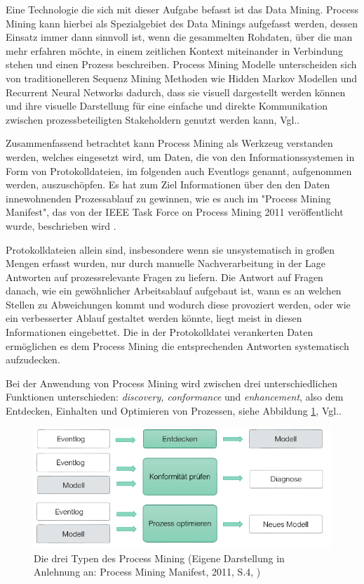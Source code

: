 Eine Technologie die sich mit dieser Aufgabe befasst ist das Data Mining. Process Mining kann hierbei als Spezialgebiet des Data Minings aufgefasst werden, dessen Einsatz immer dann sinnvoll ist, wenn die gesammelten Rohdaten, über die man mehr erfahren möchte, in einem zeitlichen Kontext miteinander in Verbindung stehen und einen Prozess beschreiben.
Process Mining Modelle unterscheiden sich von traditionelleren Sequenz Mining Methoden wie Hidden Markov Modellen\cite{hmm} und Recurrent Neural Networks\cite{rnn} dadurch, dass sie visuell dargestellt werden können und ihre visuelle Darstellung für eine einfache und direkte Kommunikation zwischen prozessbeteiligten Stakeholdern genutzt werden kann, Vgl.\cite{localMining}.

Zusammenfassend betrachtet kann Process Mining als Werkzeug verstanden werden, welches eingesetzt wird, um Daten, die von den Informationssystemen in Form von Protokolldateien, im folgenden auch Eventlogs genannt, aufgenommen werden, auszuschöpfen. Es hat zum Ziel  Informationen über den den Daten innewohnenden Prozessablauf zu gewinnen, wie es auch im "Process Mining Manifest", das von der IEEE Task Force on Process Mining 2011 veröffentlicht wurde, beschrieben wird \cite{PMManifesto}. 

Protokolldateien allein sind, insbesondere wenn sie unsystematisch in großen Mengen erfasst wurden, nur durch manuelle Nachverarbeitung in der Lage Antworten auf prozessrelevante Fragen zu liefern. Die Antwort auf Fragen danach, wie ein gewöhnlicher Arbeitsablauf aufgebaut ist, wann es an welchen Stellen zu Abweichungen kommt und wodurch diese provoziert werden, oder wie ein verbesserter Ablauf gestaltet werden könnte, liegt meist in diesen Informationen eingebettet. Die in der Protokolldatei verankerten Daten ermöglichen es dem Process Mining die entsprechenden Antworten systematisch aufzudecken. 

Bei der Anwendung von Process Mining wird zwischen drei unterschiedlichen Funktionen unterschieden:  \textit{discovery, conformance} und \textit{enhancement}, also dem Entdecken, Einhalten und Optimieren von Prozessen, siehe Abbildung \ref{fig:pm_functions}, Vgl.\cite{PMManifesto}.
\vspace{10mm}

\begin{figure}[!ht]
    \centering
    \includegraphics[scale=0.8]{figures/Appbildungen/PM_functions.PNG}
    \caption{Die drei Typen des Process Mining (Eigene Darstellung in Anlehnung an: Process Mining Manifest, 2011, S.4, \cite{PMManifesto})}
    \label{fig:pm_functions}
\end{figure}


